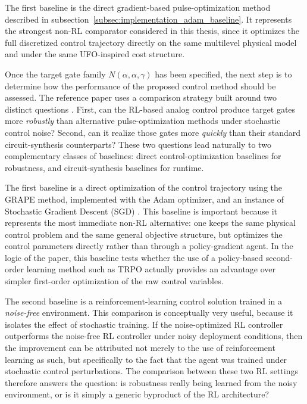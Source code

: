 The first baseline is the direct gradient-based pulse-optimization method described in subsection~\ref{subsec:implementation_adam_baseline}. It represents the strongest non-RL comparator considered in this thesis, since it optimizes the full discretized control trajectory directly on the same multilevel physical model and under the same UFO-inspired cost structure.

Once the target gate family \(N(\alpha,\alpha,\gamma)\) has been specified, the next step is to determine how the performance of the proposed control method should be assessed. The reference paper uses a comparison strategy built around two distinct questions \cite{Niu2019}. First, can the RL-based analog control produce target gates more \emph{robustly} than alternative pulse-optimization methods under stochastic control noise? Second, can it realize those gates more \emph{quickly} than their standard circuit-synthesis counterparts? These two questions lead naturally to two complementary classes of baselines: direct control-optimization baselines for robustness, and circuit-synthesis baselines for runtime.

The first baseline is a direct optimization of the control trajectory using the GRAPE method, implemented with the Adam optimizer, and an instance of Stochastic Gradient Descent (SGD) \cite{Niu2019,Kingma2015}. This baseline is important because it represents the most immediate non-RL alternative: one keeps the same physical control problem and the same general objective structure, but optimizes the control parameters directly rather than through a policy-gradient agent. In the logic of the paper, this baseline tests whether the use of a policy-based second-order learning method such as TRPO actually provides an advantage over simpler first-order optimization of the raw control variables.

The second baseline is a reinforcement-learning control solution trained in a \emph{noise-free} environment. This comparison is conceptually very useful, because it isolates the effect of stochastic training. If the noise-optimized RL controller outperforms the noise-free RL controller under noisy deployment conditions, then the improvement can be attributed not merely to the use of reinforcement learning as such, but specifically to the fact that the agent was trained under stochastic control perturbations. The comparison between these two RL settings therefore answers the question: is robustness really being learned from the noisy environment, or is it simply a generic byproduct of the RL architecture?

